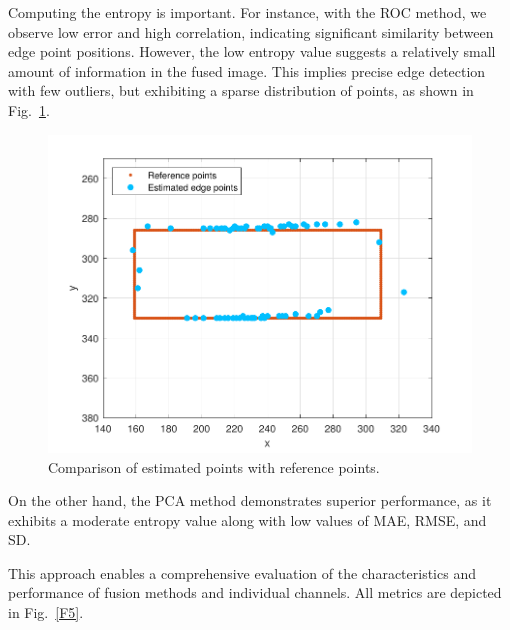 \documentclass{article}
\begin{document}
Computing the entropy is important. 
For instance, with the ROC method, we observe low error and high correlation, indicating significant similarity between edge point positions. 
However, the low entropy value suggests a relatively small amount of information in the fused image. This implies precise edge detection with few outliers, but exhibiting a sparse distribution of points, as shown in Fig.~\ref{F4}. 

\begin{figure}[hbt] %
	\includegraphics[scale=0.55]{figures/roc_f.pdf}\vspace{-1.5mm} 
	\caption{Comparison of estimated points with reference points.}
	\label{F4}
\end{figure}
On the other hand, the PCA method demonstrates superior performance, as it exhibits a moderate entropy value along with low values of MAE, RMSE, and SD.

This approach enables a comprehensive evaluation of the characteristics and performance of fusion methods and individual channels. All metrics are depicted in Fig.~\ref{F5}. 
\end{document}
